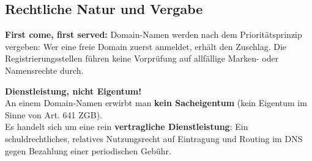 \subsection{Rechtliche Natur und Vergabe}

\begin{definition}
    \textbf{First come, first served:} Domain-Namen werden nach dem Prioritätsprinzip vergeben: Wer eine freie Domain zuerst anmeldet, erhält den Zuschlag. Die Registrierungsstellen führen keine Vorprüfung auf allfällige Marken- oder Namensrechte durch.
\end{definition}

\begin{important}
    \textbf{Dienstleistung, nicht Eigentum!} \\
    An einem Domain-Namen erwirbt man \textbf{kein Sacheigentum} (kein Eigentum im Sinne von Art. 641 ZGB). \\
    Es handelt sich um eine rein \textbf{vertragliche Dienstleistung}: Ein schuldrechtliches, relatives Nutzungsrecht auf Eintragung und Routing im DNS gegen Bezahlung einer periodischen Gebühr.
\end{important}